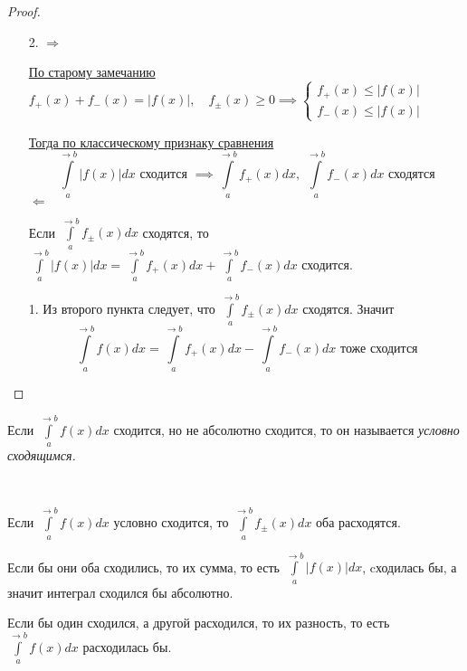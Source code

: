 \documentclass[../main.tex]{subfiles}
\begin{document}
\begin{proof}
    
    ~

    \begin{enumerate}
        \item [2.] \( \boxed{ \Longrightarrow }\)
        \par \hyperlink{note:pm}{По старому замечанию} \( f_+\left( x\right)+f_-\left( x\right)=\left| f\left( x\right)\right|,\quad f_\pm\left( x\right) \geq 0 \implies \begin{cases}f_+\left( x\right) \leq \left| f\left( x\right)\right|\\f_-\left( x\right) \leq \left| f\left( x\right)\right| \end{cases}\)
        \par \hyperlink{thm:converge_classic}{Тогда по классическому признаку сравнения} 
        \[ \displaystyle\int\limits_{ a}^{ \rightarrow b} \left| f\left( x\right)\right|dx \text{ сходится } \implies \displaystyle\int\limits_{ a}^{ \rightarrow b} f_+\left( x\right)dx,\; \displaystyle\int\limits_{ a}^{ \rightarrow b} f_-\left( x\right)dx \text{ сходятся}\]
        \( \boxed{ \Longleftarrow}\)
        \par Если \( \displaystyle\int\limits_{ a}^{ \rightarrow b} f_\pm \left( x\right)dx\) сходятся, то \( \displaystyle\int\limits_{ a}^{ \rightarrow b} \left| f\left( x\right)\right|dx= \displaystyle\int\limits_{ a}^{ \rightarrow b} f_+\left( x\right)dx+ \displaystyle\int\limits_{ a}^{ \rightarrow b} f_-\left( x\right)dx\) сходится. 
        \item [1.] Из второго пункта следует, что \( \displaystyle\int\limits_{ a}^{ \rightarrow b} f_\pm\left( x\right)dx\) сходятся. Значит 
        \[ \displaystyle\int\limits_{ a}^{ \rightarrow b} f\left( x\right)dx= \displaystyle\int\limits_{ a}^{ \rightarrow b} f_+\left( x\right)dx- \displaystyle\int\limits_{ a}^{ \rightarrow b} f_-\left( x\right)dx \text{ тоже сходится}\]
    \end{enumerate}
\end{proof}

Если \( \displaystyle\int\limits_{ a}^{ \rightarrow b} f\left( x\right)dx\) сходится, но не абсолютно сходится, то он называется \emph{условно сходящимся.} 

\begin{note}
    
    ~

    Если \( \displaystyle\int\limits_{ a}^{ \rightarrow b} f\left( x\right)dx\) условно сходится, то \( \displaystyle\int\limits_{ a}^{ \rightarrow b} f_\pm\left( x\right)dx\) оба расходятся. 

    Если бы они оба сходились, то их сумма, то есть \( \displaystyle\int\limits_{ a}^{ \rightarrow b} \left| f\left( x\right)\right|dx\), cходилась бы, а значит интеграл сходился бы абсолютно.
    
    Если бы один сходился, а другой расходился, то их разность, то есть \( \displaystyle\int\limits_{ a}^{ \rightarrow b} f\left( x\right)dx\) расходилась бы. 
\end{note}
\end{document}
